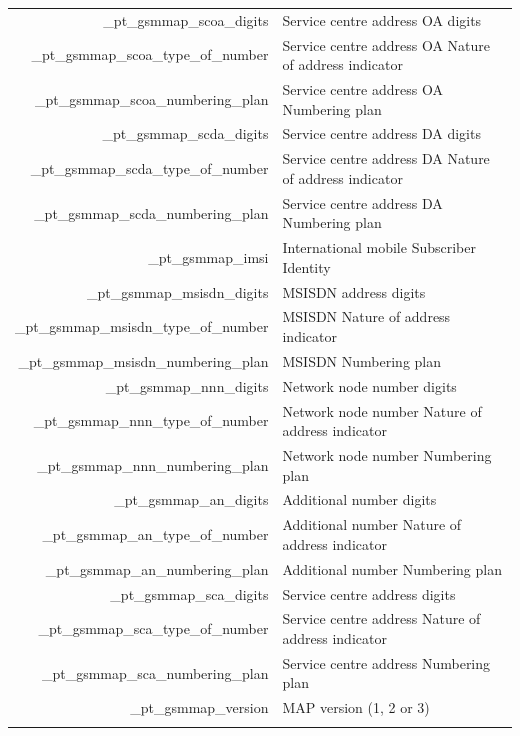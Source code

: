 \documentclass[a4paper,latin]{paper}
\begin{document}
\noindent
\begin{tabularx}{\linewidth}{ | >{\ttfamily} r | >{\ttfamily} X |}
	\hline
	\rowcolor{blue!10}
	\multicolumn{2}{| l |}{\acrfull{map}}			\\
	\hline
	\_pt\_gsmmap\_scoa\_digits				& Service centre address OA digits \\
	\_pt\_gsmmap\_scoa\_type\_of\_number			& Service centre address OA Nature of address indicator \\
	\_pt\_gsmmap\_scoa\_numbering\_plan			& Service centre address OA Numbering plan \\
	\_pt\_gsmmap\_scda\_digits				& Service centre address DA digits \\
	\_pt\_gsmmap\_scda\_type\_of\_number			& Service centre address DA Nature of address indicator \\
	\_pt\_gsmmap\_scda\_numbering\_plan			& Service centre address DA Numbering plan \\
	\_pt\_gsmmap\_imsi					& International mobile Subscriber Identity \\
	\_pt\_gsmmap\_msisdn\_digits				& MSISDN address digits \\
	\_pt\_gsmmap\_msisdn\_type\_of\_number			& MSISDN Nature of address indicator \\
	\_pt\_gsmmap\_msisdn\_numbering\_plan			& MSISDN Numbering plan \\
	\_pt\_gsmmap\_nnn\_digits				& Network node number digits \\
	\_pt\_gsmmap\_nnn\_type\_of\_number			& Network node number Nature of address indicator \\
	\_pt\_gsmmap\_nnn\_numbering\_plan			& Network node number Numbering plan \\
	\_pt\_gsmmap\_an\_digits				& Additional number digits \\
	\_pt\_gsmmap\_an\_type\_of\_number			& Additional number Nature of address indicator \\
	\_pt\_gsmmap\_an\_numbering\_plan			& Additional number Numbering plan \\
	\_pt\_gsmmap\_sca\_digits				& Service centre address digits \\
	\_pt\_gsmmap\_sca\_type\_of\_number			& Service centre address Nature of address indicator \\
	\_pt\_gsmmap\_sca\_numbering\_plan			& Service centre address Numbering plan \\
	\_pt\_gsmmap\_version					& MAP version (1, 2 or 3) \\
	\hline
	\rowcolor{blue!10}

\end{tabularx}
\end{document}
